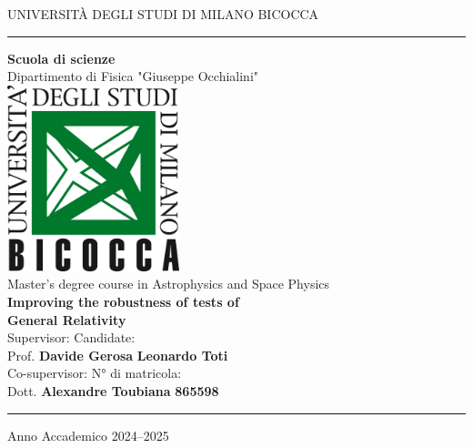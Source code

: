 \documentclass[a4paper,12pt]{article}
\begin{document}
    
    \begin{titlepage}
	\begin{center}
            \Large{UNIVERSIT\`A DEGLI STUDI DI MILANO BICOCCA} 
            \\[8pt]
            \hrule
           	\vspace{20pt}
            {\bf \huge \sc Scuola di scienze} \\[10pt]
            {\huge Dipartimento di Fisica "Giuseppe Occhialini"} \\[15pt]
            \includegraphics[width=5cm]{logo.png}\\[20pt]
            {\huge Master's degree course in Astrophysics and Space Physics}\\[50pt]
            {\Huge \bfseries Improving the robustness of tests of \\[10pt] General Relativity}\\[50pt]
            \large{Supervisor:}
            \hfill
            \large{Candidate:}\\
            Prof. \textbf{Davide Gerosa}
            \hfill
            \textbf{Leonardo Toti}\\[20pt]
            \large{Co-supervisor:}
            \hfill
            \large{N° di matricola:}\\
            Dott. \textbf{Alexandre Toubiana}
            \hfill
            \textbf{865598}\\[55pt]
			
            \hrule
            \vspace{10pt}
            \LARGE Anno Accademico 2024--2025
	\end{center}
	\end{titlepage}
        \restoregeometry
    
    \thispagestyle{empty}
	

 	\clearpage\null\thispagestyle{empty}\newpage
 	
	\clearpage\null\thispagestyle{empty}\newpage
	
	
	\newpage        
	\tableofcontents                        
	\clearpage\null\thispagestyle{empty}\newpage
	


	

	
	
	
        
	
	
	
	\printbibliography   	
	\clearpage\null\thispagestyle{empty}\newpage
	
	\thispagestyle{empty} 
	
	\clearpage\null\thispagestyle{empty}\newpage	 
	 
	 
\end{document}
